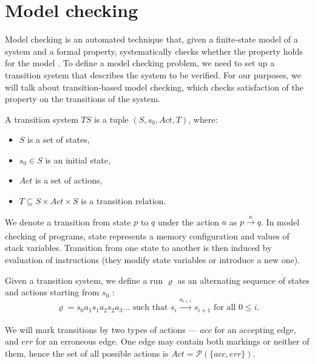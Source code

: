 \section{Model checking} \label{sec:mc}
Model checking is an automated technique that, given a finite-state model of a
system and a formal property, systematically checks whether the property holds
for the model \cite{Baier08}. To define a model checking problem,
we need to set up a transition system that describes the system to be
verified. For our purposes, we will talk about transition-based model checking,
which checks satisfaction of the property on the transitions of the system.

\noindent
\begin{minipage}{\textwidth}
\begin{definition}\label{def:ts}
\medskip
A transition system $TS$ is a tuple $(S, s_0, Act, T)$, where:
\begin{itemize}
    \item $S$ is a set of states,
    \item $s_0 \in S$ is an initial state,
    \item $Act$ is a set of actions,
    \item $T \subseteq S \times Act \times S$ is a
    transition relation.
\end{itemize}
\end{definition}
\end{minipage}
\noindent
We denote a transition from state $p$ to $q$ under the action $a$ as $p
\xrightarrow[]{a} q$. In model checking of \LLVM programs, state represents a
memory configuration and values of stack variables. Transition from one state to
another is then induced by evaluation of \LLVM instructions (they modify state
variables or introduce a new one).

Given a transition system, we define a run $\varrho$ as an alternating
sequence of states and actions starting from $s_0$ \cite{Baier08}:
\[
    \varrho = s_0 a_1 s_1 a_2 s_2 a_3 \dots \text{ such that } s_i
    \xrightarrow[]{a_{i+1}} s_{i+1} \text{ for all } 0 \leq i.
\]

We will mark transitions by two types of actions --- $acc$ for an accepting edge,
and $err$ for an erroneous edge. One edge may contain both markings or neither of
them, hence the set of all possible actions is $Act = \mathcal{P}(\{acc,
err\})$.

